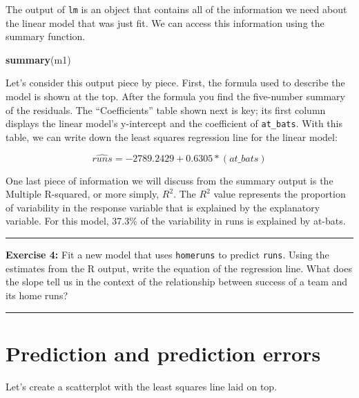 \documentclass[]{book}
\newenvironment{Shaded}{\begin{snugshade}}{\end{snugshade}}
\newcommand{\KeywordTok}[1]{\textcolor[rgb]{0.13,0.29,0.53}{\textbf{#1}}}
\newcommand{\NormalTok}[1]{#1}
\newcommand{\OperatorTok}[1]{\textcolor[rgb]{0.81,0.36,0.00}{\textbf{#1}}}
\newcommand{\StringTok}[1]{\textcolor[rgb]{0.31,0.60,0.02}{#1}}
\theoremstyle{definition}
\theoremstyle{definition}
\theoremstyle{definition}
\theoremstyle{remark}
\begin{document}
The output of \texttt{lm} is an object that contains all of the
information we need about the linear model that was just fit. We can
access this information using the summary function.

\begin{Shaded}
\begin{Highlighting}[]
\KeywordTok{summary}\NormalTok{(m1)}
\end{Highlighting}
\end{Shaded}

Let's consider this output piece by piece. First, the formula used to
describe the model is shown at the top. After the formula you find the
five-number summary of the residuals. The ``Coefficients'' table shown
next is key; its first column displays the linear model's y-intercept
and the coefficient of \texttt{at\_bats}. With this table, we can write
down the least squares regression line for the linear model:

\[
  \widehat{runs} = -2789.2429 + 0.6305 * (at\_bats)
\]

One last piece of information we will discuss from the summary output is
the Multiple R-squared, or more simply, \(R^2\). The \(R^2\) value
represents the proportion of variability in the response variable that
is explained by the explanatory variable. For this model, 37.3\% of the
variability in runs is explained by at-bats.

\begin{center}\rule{0.5\linewidth}{\linethickness}\end{center}

\textbf{Exercise 4:} Fit a new model that uses \texttt{homeruns} to
predict \texttt{runs}. Using the estimates from the R output, write the
equation of the regression line. What does the slope tell us in the
context of the relationship between success of a team and its home runs?

\begin{center}\rule{0.5\linewidth}{\linethickness}\end{center}

\hypertarget{prediction-and-prediction-errors}{%
\section{Prediction and prediction
errors}\label{prediction-and-prediction-errors}}

Let's create a scatterplot with the least squares line laid on top.

\begin{Shaded}
\end{Shaded}
\end{document}
